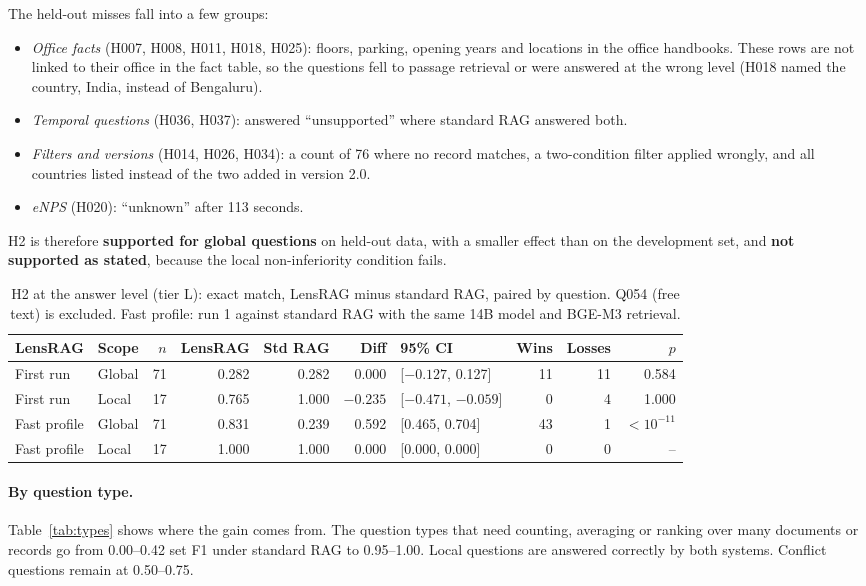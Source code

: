 \documentclass[11pt,letterpaper,oneside]{report}
\begin{document}
The held-out misses fall into a few groups:
\begin{itemize}
  \item \emph{Office facts} (H007, H008, H011, H018, H025): floors, parking,
  opening years and locations in the office handbooks. These rows are not
  linked to their office in the fact table, so the questions fell to passage
  retrieval or were answered at the wrong level (H018 named the country,
  India, instead of Bengaluru).
  \item \emph{Temporal questions} (H036, H037): answered ``unsupported''
  where standard RAG answered both.
  \item \emph{Filters and versions} (H014, H026, H034): a count of 76 where
  no record matches, a two-condition filter applied wrongly, and all
  countries listed instead of the two added in version 2.0.
  \item \emph{eNPS} (H020): ``unknown'' after 113 seconds.
\end{itemize}
H2 is therefore \textbf{supported for global questions} on held-out data,
with a smaller effect than on the development set, and \textbf{not supported
as stated}, because the local non-inferiority condition fails.

\begin{table}[htbp]
\centering\small
\caption{H2 at the answer level (tier L): exact match, LensRAG minus standard
RAG, paired by question. Q054 (free text) is excluded. Fast profile: run 1
against standard RAG with the same 14B model and BGE-M3 retrieval.}
\label{tab:h2-answers}
\begin{tabular}{@{}llrrrrlrrr@{}}
\toprule
LensRAG & Scope & $n$ & LensRAG & Std RAG & Diff & 95\% CI & Wins & Losses & $p$ \\
\midrule
First run & Global & 71 & 0.282 & 0.282 & 0.000 & [$-0.127$, 0.127] & 11 & 11 & 0.584 \\
First run & Local & 17 & 0.765 & 1.000 & $-0.235$ & [$-0.471$, $-0.059$] & 0 & 4 & 1.000 \\
Fast profile & Global & 71 & 0.831 & 0.239 & 0.592 & [0.465, 0.704] & 43 & 1 & $<10^{-11}$ \\
Fast profile & Local & 17 & 1.000 & 1.000 & 0.000 & [0.000, 0.000] & 0 & 0 & -- \\
\bottomrule
\end{tabular}
\end{table}

\paragraph{By question type.}
Table~\ref{tab:types} shows where the gain comes from. The question types that
need counting, averaging or ranking over many documents or records go from
0.00--0.42 set F1 under standard RAG to 0.95--1.00. Local questions are
answered correctly by both systems. Conflict questions remain at 0.50--0.75.
\end{document}
